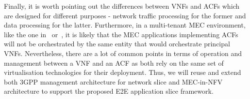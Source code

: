 Finally, it is worth pointing out the differences between VNFs and ACFs which are designed for different purposes - network traffic processing for the former and data processing for the latter. Furthermore, in a multi-tenant MEC environment, like the one in~\cite{Cominardi2020} or~\cite{2020_MNET_MEC_subslice}, it is likely that the MEC applications implementing ACFs will not be orchestrated by the same entity that would orchestrate principal VNFs. Nevertheless, there are a lot of common points in terms of operation and management between a VNF and an ACF as both rely on the same set of virtualisation technologies for their deployment. Thus, we will reuse and extend both 3GPP management architecture for network slice and MEC-in-NFV architecture to support the proposed E2E application slice framework.
%
